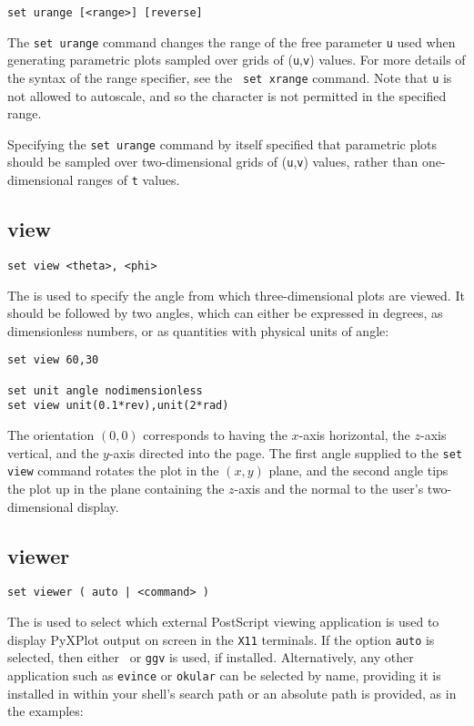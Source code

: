 \begin{verbatim}
set urange [<range>] [reverse]
\end{verbatim}

The {\tt set urange} command changes the range of the free parameter {\tt u}
used when generating parametric plots sampled over grids of ({\tt u},{\tt v})
values.  For more details of the syntax of the range specifier, see the {\tt
set xrange} command. Note that {\tt u} is not allowed to autoscale, and so the
{\tt *} character is not permitted in the specified range.

Specifying the {\tt set urange} command by itself specified that parametric
plots should be sampled over two-dimensional grids of ({\tt u},{\tt v}) values,
rather than one-dimensional ranges of {\tt t} values.


\subsection{view}

\begin{verbatim}
set view <theta>, <phi>
\end{verbatim}

The  is used to specify the angle from which
three-dimensional plots are viewed. It should be followed by two angles, which
can either be expressed in degrees, as dimensionless numbers, or as quantities
with physical units of angle:
\begin{verbatim}
set view 60,30

set unit angle nodimensionless
set view unit(0.1*rev),unit(2*rad)
\end{verbatim}
The orientation $(0,0)$ corresponds to having the $x$-axis horizontal, the
$z$-axis vertical, and the $y$-axis directed into the page. The first angle
supplied to the {\tt set view} command rotates the plot in the $(x,y)$ plane,
and the second angle tips the plot up in the plane containing the $z$-axis and
the normal to the user's two-dimensional display.


\subsection{viewer}

\begin{verbatim}
set viewer ( auto | <command> )
\end{verbatim}

The  is used to select which external PostScript viewing
application is used to display PyXPlot output on screen in the {\tt X11}
terminals. If the option {\tt auto} is selected, then either \ghostview\ or
{\tt ggv} is used, if installed. Alternatively, any other application such as
{\tt evince} or {\tt okular} can be selected by name, providing it is installed
in within your shell's search path or an absolute path is provided, as in the
examples:

